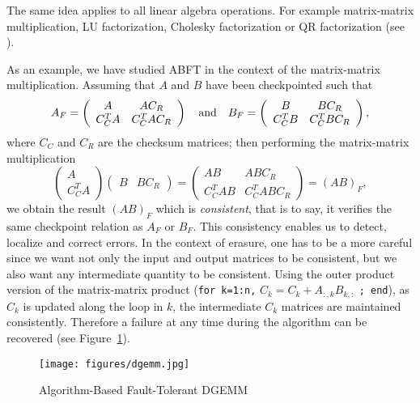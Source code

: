 \documentclass[pdftex,11pt]{article}
\begin{document}
The same idea applies to all linear algebra operations. For example
matrix-matrix multiplication, LU factorization, Cholesky factorization
or QR factorization (see
\cite{BaAb:86,Bane:90,HuAb:84,LuPa:88,RoBa:94}).

As an example, we have studied ABFT in the context of the
matrix-matrix multiplication.  Assuming that $A$ and $B$ have been
checkpointed such that
$$
   A_F = \left(\begin{array}{cc} A & AC_R \\ C_C^TA & C_C^TAC_R \end{array} \right) 
\quad \textmd{and} \quad
   B_F = \left(\begin{array}{cc} B & BC_R \\ C_C^TB & C_C^TBC_R \end{array} \right) ,
$$
where $C_C$ and $C_R$ are the checksum matrices; then performing the
matrix-matrix multiplication
\begin{equation}\label{eq:ABFT-GEMM}
   \left(\begin{array}{cc} A \\ C_C^TA \end{array} \right) 
   \left(\begin{array}{cc} B & BC_R \end{array} \right) 
=
   \left(\begin{array}{cc} AB & ABC_R \\ C_C^TAB & C_C^TABC_R \end{array} \right) 
=  (AB)_F
,
\end{equation}
we obtain the result $(AB)_F$ which is \textit{consistent}, that is to
say, it verifies the same checkpoint relation as $A_F$ or $B_F$. This
consistency enables us to detect, localize and correct errors.  In the
context of erasure, one has to be a more careful since we want not
only the input and output matrices to be consistent, but we also want
any intermediate quantity to be consistent. Using the outer product
version of the matrix-matrix product (\texttt{for k=1:n,} $C_k = C_k +
A_{:,k}B_{k,:}$ \texttt{; end}), as $C_k$ is updated along the loop in
$k$, the intermediate $C_k$ matrices are maintained
consistently. Therefore a failure at any time during the algorithm can
be recovered (see Figure~\ref{fig:dgemm}).
 
\begin{figure}[!h]
\color{DodgerBlue4}
\begin{center}
\texttt{[image: figures/dgemm.jpg]}
\end{center}
\caption{\label{fig:dgemm}
\color{black}
Algorithm-Based Fault-Tolerant DGEMM
}
\end{figure}
\end{document}
